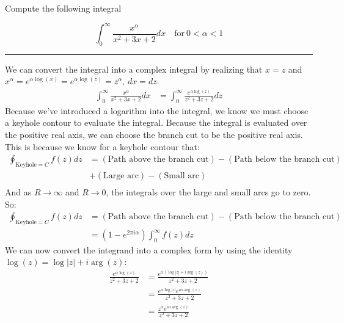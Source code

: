 \begin{example}

    Compute the following integral

    $$\int_0^\infty\frac{x^\alpha}{x^2+3x+2}dx\quad\mathrm{for~}0<\alpha<1$$


    \hrule
    \vspace{0.5cm}

    We can convert the integral into a complex integral by realizing that $x = z$ and $x^\alpha = e^{\alpha\log(x)} = e^{\alpha\log(z)} = z^\alpha, \, dx = dz$.
    \begin{align*}
        \int_0^\infty\frac{x^\alpha}{x^2+3x+2}dx & = \int_0^\infty\frac{e^{\alpha\log(z)}}{z^2+3z+2}dz
    \end{align*}
    Because we've introduced a logarithm into the integral, we know we must choose a keyhole contour to evaluate the integral. Because the integral is evaluated over the positive real axis, we can choose the branch cut to be the positive real axis. This is because we know for a keyhole contour that:
    \begin{align*}
        \oint_{\text{Keyhole} = C} f(z)dz & = (\text{Path above the branch cut}) - (\text{Path below the branch cut}) \\
                                          & + (\text{Large arc}) - (\text{Small arc})                                 \\
    \end{align*}
    And as $R \rightarrow \infty$ and $R \rightarrow 0$, the integrals over the large and small arcs go to zero. So:
    \begin{align*}
        \oint_{\text{Keyhole} = C} f(z)dz & = (\text{Path above the branch cut}) - (\text{Path below the branch cut}) \\
                                          & = (1 - e^{2\pi i \alpha})\int_0^\infty f(z)dz
    \end{align*}
    We can now convert the integrand into a complex form by using the identity $\log(z) = \log|z| + i\arg(z)$:
    \begin{align*}
        \frac{e^{\alpha\log(z)}}{z^2+3z+2} & = \frac{e^{\alpha(\log|z| + i\arg(z))}}{z^2+3z+2}      \\
                                           & = \frac{e^{\alpha\log|z|}e^{i\alpha\arg(z)}}{z^2+3z+2} \\
                                           & = \frac{z^\alpha e^{i\alpha\arg(z)}}{z^2+3z+2}
    \end{align*}

\end{example}
